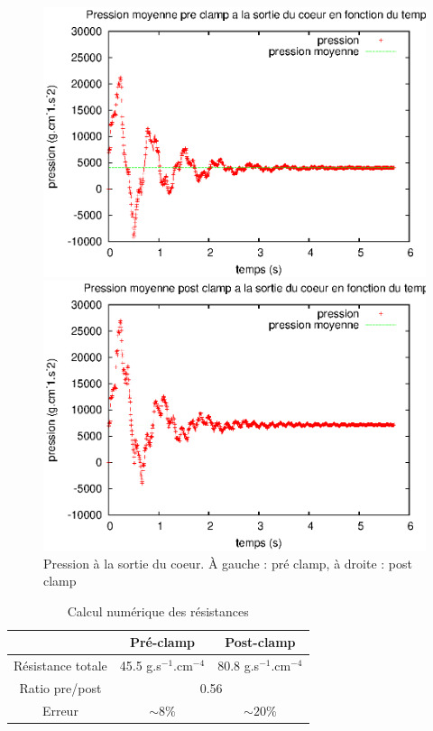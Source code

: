 \documentclass{config}
\begin{document}
\begin{figure}[H]
\begin{minipage}{.48\textwidth}
\includegraphics[scale=0.7]{preclampP.eps}
\end{minipage} \hfill
\begin{minipage}{.48\textwidth}
\includegraphics[scale=0.7]{postclampP.eps}
\end{minipage}
\caption{Pression à la sortie du coeur. \`A gauche : pré clamp, à droite : post clamp}
\end{figure}

\begin{table}[H]
\begin{center}
\begin{tabular}{|c|c|c|}
\hline
 & Pré-clamp & Post-clamp \\ 
\hline 
Résistance totale & 45.5 g.s$^{-1}$.cm$^{-4}$ & 80.8 g.s$^{-1}$.cm$^{-4}$ \\
\hline
\hline 
Ratio pre/post & \multicolumn{2}{|c|}{0.56}\\
\hline
\hline 
Erreur & $\sim  8 \%$  & $\sim 20 \%$ \\ 
\hline
\end{tabular} 
\caption{Calcul numérique des résistances }
\label{res_post}
\end{center}
\end{table}
\end{document}
